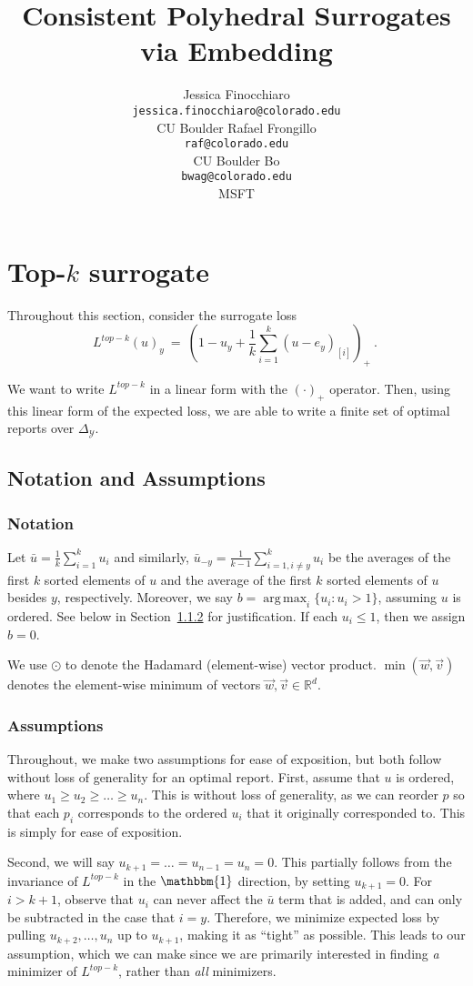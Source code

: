 \documentclass[12pt]{article}
\title{Consistent Polyhedral Surrogates via Embedding}
\author{%
 Jessica Finocchiaro\raf{Jessie?} \\
 \texttt{jessica.finocchiaro@colorado.edu}\\
 CU Boulder
 \And
 Rafael Frongillo\\
 \texttt{raf@colorado.edu}\\
 CU Boulder
 \And
 Bo\\
 \texttt{bwag@colorado.edu}\\
 MSFT
}
\newcommand{\reals}{\mathbb{R}}
\newcommand{\simplex}{\Delta_\Y}
\newcommand{\Y}{\mathcal{Y}}
\newcommand{\ones}{\mathbbm{1}}
\DeclareMathOperator*{\argmax}{arg\,max}
\begin{document}
\section{Top-$k$ surrogate}
Throughout this section, consider the surrogate loss \begin{equation}\label{eq:top-k-surrogate}
L^{top-k}(u)_y~=~\left(1 - u_y + \frac{1}{k} \sum_{i=1}^k (u - e_y)_{[i]} \right)_+~.~
\end{equation}

We want to write $L^{top-k}$ in a linear form with the $(\cdot)_+$ operator.
Then, using this linear form of the expected loss, we are able to write a finite set of optimal reports over $\simplex$.

\subsection{Notation and Assumptions}
\subsubsection{Notation}
Let $\bar{u} = \frac 1 k \sum_{i = 1}^k u_i$ and similarly, $\bar{u}_{-y} = \frac{1}{k-1} \sum_{i=1, i \neq y}^k u_i$ be the averages of the first $k$ sorted elements of $u$ and the average of the first $k$ sorted elements of $u$ besides $y$, respectively.
Moreover, we say $b = \argmax_i \{u_i : u_i > 1\}$, assuming $u$ is ordered.
See below in Section~\ref{sec:assumptions} for justification.
If each $u_i \leq 1$, then we assign $b = 0$.

We use $\odot$ to denote the Hadamard (element-wise) vector product.
$\min(\vec w, \vec v)$ denotes the element-wise minimum of vectors $\vec w, \vec v \in \reals^d$.

\subsubsection{Assumptions}\label{sec:assumptions}
Throughout, we make two assumptions for ease of exposition, but both follow without loss of generality for an optimal report.  %
First, assume that $u$ is ordered, where $u_1 \geq u_2 \geq \ldots \geq u_n$.
This is without loss of generality, as we can reorder $p$ so that each $p_i$ corresponds to the ordered $u_i$ that it originally corresponded to.
This is simply for ease of exposition.

Second, we will say $u_{k+1} = \ldots = u_{n-1} = u_n = 0$.
This partially follows from the invariance of $L^{top-k}$ in the $\ones$ direction, by setting $u_{k+1} = 0$.
For $i > k+1$, observe that $u_i$ can never affect the $\bar{u}$ term that is added, and can only be subtracted in the case that $i = y$.
Therefore, we minimize expected loss by pulling $u_{k+2},\ldots, u_n$ up to $u_{k+1}$, making it as ``tight'' as possible.
This leads to our assumption, which we can make since we are primarily interested in finding \emph{a} minimizer of $L^{top-k}$, rather than \emph{all} minimizers.
\end{document}
